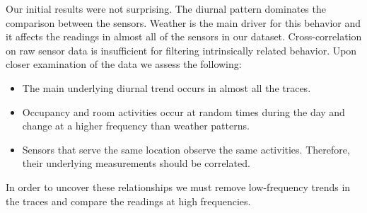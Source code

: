 Our initial results were not surprising.  The diurnal pattern dominates the comparison between the sensors.
Weather is the main driver for this behavior and it affects the readings in almost all of the
sensors in our dataset.  Cross-correlation on raw sensor data is insufficient for filtering intrinsically related
behavior.  Upon closer examination of the data we assess the following:

\begin{itemize}
\item The main underlying diurnal trend occurs in almost all the traces.
\item Occupancy and room activities occur at random times during the day and change 
		at a higher frequency than weather patterns.
\item Sensors that serve the same location observe the same activities.  Therefore, their underlying
		measurements should be correlated.
\end{itemize}

In order to uncover these relationships we must remove low-frequency trends in the traces and
compare the readings at high frequencies.


